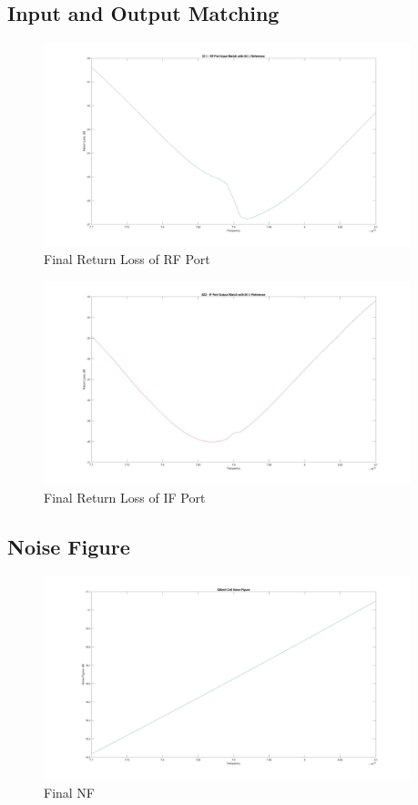 \documentclass{article}                                                         %
\begin{document}
\subsection{Input and Output Matching}
\begin{figure}[H]
  \centering
  \includegraphics[width=0.95\textwidth] {Plots/S11.jpg}
  \caption{Final Return Loss of RF Port}
    \label{fig:matS11}
\end{figure}
\begin{figure}[H]
  \centering
  \includegraphics[width=0.95\textwidth] {Plots/S22.jpg}
  \caption{Final Return Loss of IF Port}
    \label{fig:matS11}
\end{figure}

\subsection{Noise Figure}
\begin{figure}[H]
  \centering
  \includegraphics[width=0.95\textwidth] {Plots/NF.jpg}
  \caption{Final NF}
    \label{fig:matNF}
\end{figure}
\end{document}
